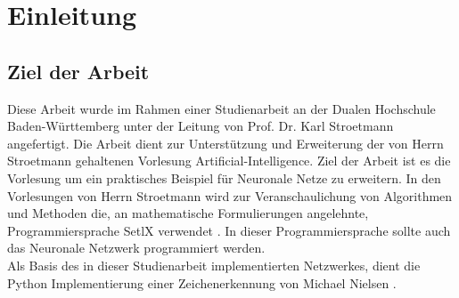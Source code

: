 \chapter{Einleitung}

\section{Ziel der Arbeit}
Diese Arbeit wurde im Rahmen einer Studienarbeit an der Dualen Hochschule Baden-Württemberg unter der Leitung von Prof. Dr. Karl Stroetmann angefertigt. Die Arbeit dient zur Unterstützung und Erweiterung der von Herrn Stroetmann gehaltenen Vorlesung \glqq Artificial-Intelligence\grqq \cite{stroetmann:2017}. Ziel der Arbeit ist es die Vorlesung um ein praktisches Beispiel für Neuronale Netze zu erweitern. In den Vorlesungen von Herrn Stroetmann wird zur Veranschaulichung von Algorithmen und Methoden die, an mathematische Formulierungen angelehnte, Programmiersprache SetlX verwendet \cite{setlx:2017}. In dieser Programmiersprache sollte auch das Neuronale Netzwerk programmiert werden. \\
Als Basis des in dieser Studienarbeit implementierten Netzwerkes, dient die Python Implementierung einer Zeichenerkennung von Michael Nielsen \cite{nielson:2017}.

